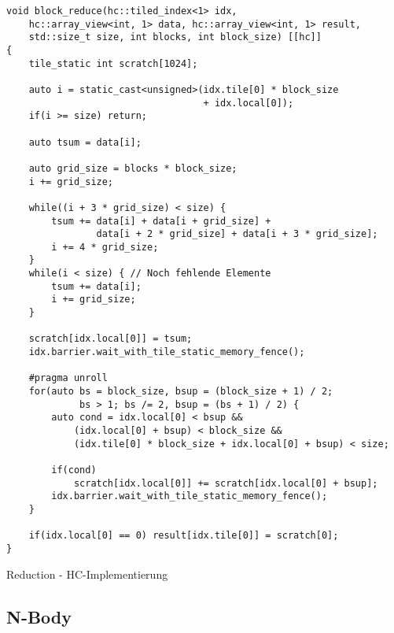 \begin{code}
    \begin{verbatim}
void block_reduce(hc::tiled_index<1> idx,
    hc::array_view<int, 1> data, hc::array_view<int, 1> result,
    std::size_t size, int blocks, int block_size) [[hc]]
{
    tile_static int scratch[1024];

    auto i = static_cast<unsigned>(idx.tile[0] * block_size
                                   + idx.local[0]);
    if(i >= size) return;

    auto tsum = data[i];

    auto grid_size = blocks * block_size;
    i += grid_size;

    while((i + 3 * grid_size) < size) {
        tsum += data[i] + data[i + grid_size] +
                data[i + 2 * grid_size] + data[i + 3 * grid_size];
        i += 4 * grid_size;
    }
    while(i < size) { // Noch fehlende Elemente
        tsum += data[i];
        i += grid_size;
    }

    scratch[idx.local[0]] = tsum;
    idx.barrier.wait_with_tile_static_memory_fence();

    #pragma unroll
    for(auto bs = block_size, bsup = (block_size + 1) / 2;
             bs > 1; bs /= 2, bsup = (bs + 1) / 2) {
        auto cond = idx.local[0] < bsup &&
            (idx.local[0] + bsup) < block_size &&
            (idx.tile[0] * block_size + idx.local[0] + bsup) < size;

        if(cond)
            scratch[idx.local[0]] += scratch[idx.local[0] + bsup];
        idx.barrier.wait_with_tile_static_memory_fence();
    }

    if(idx.local[0] == 0) result[idx.tile[0]] = scratch[0];
}
    \end{verbatim}
    \caption{Reduction - HC-Implementierung}
    \label{anhang:hc:reduction}
\end{code}

\subsection{N-Body}


